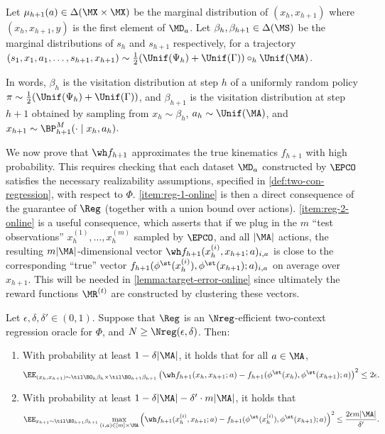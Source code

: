 \begin{definition}\label{def:marginals}
Let $\mu_{h+1}(a) \in \Delta(\MX\times\MX)$ be the marginal distribution of $(x_h,x_{h+1})$ where $(x_h,x_{h+1},y)$ is the first element of $\MD_a$. Let $\beta_h,\beta_{h+1} \in \Delta(\MS)$ be the marginal distributions of $s_h$ and $s_{h+1}$ respectively, for a trajectory $(s_1,x_1,a_1,\dots,s_{h+1},x_{h+1}) \sim \frac{1}{2}(\Unif(\Psi_h)+\Unif(\Gamma))\circ_h\Unif(\MA)$.
\end{definition}

In words, $\beta_h$ is the visitation distribution at step $h$ of a uniformly random policy $\pi \sim \frac{1}{2}(\Unif(\Psi_h)+\Unif(\Gamma))$, and $\beta_{h+1}$ is the visitation distribution at step $h+1$ obtained by sampling from $x_h \sim \beta_h$, $a_h \sim \Unif(\MA)$, and $x_{h+1} \sim \BP^M_{h+1}(\cdot\mid{}x_h,a_h)$.

We now prove that $\wh f_{h+1}$ approximates the true kinematics $f_{h+1}$ with high probability. This requires checking that each dataset $\MD_a$ constructed by $\EPCO$ satisfies the necessary realizability assumptions, specified in \cref{def:two-con-regression}, with respect to $\Phi$. \cref{item:reg-1-online} is then a direct consequence of the guarantee of $\Reg$ (together with a union bound over actions). \cref{item:reg-2-online} is a useful consequence, which asserts that if we plug in the $m$ ``test observations'' $x_h^{(1)},\dots,x_h^{(m)}$ sampled by $\EPCO$, and all $|\MA|$ actions, the resulting $m|\MA|$-dimensional vector $\wh f_{h+1}(x_h^{(i)},x_{h+1};a)_{i,a}$ is close to the corresponding ``true'' vector $f_{h+1}(\phi^\st(x_h^{(i)}),\phi^\st(x_{h+1});a)_{i,a}$ on average over $x_{h+1}$. This will be needed in \cref{lemma:target-error-online} since ultimately the reward functions $\MR^{(t)}$ are constructed by clustering these vectors.

\begin{lemma}\label{lemma:regression-bound-online}
Let $\epsilon,\delta,\delta' \in (0,1)$. Suppose that $\Reg$ is an $\Nreg$-efficient two-context regression oracle for $\Phi$, and $N \geq \Nreg(\epsilon,\delta)$. Then:
\begin{enumerate}
\item \label{item:reg-1-online} With probability at least $1-\delta|\MA|$, it holds that for all $a \in \MA$,
\[\EE_{(x_h,x_{h+1}) \sim \til\BO_h\beta_h \times \til\BO_{h+1}\beta_{h+1}}\left(\wh f_{h+1}(x_h,x_{h+1};a) - f_{h+1}(\phi^\st(x_h),\phi^\st(x_{h+1});a)\right)^2 \leq 2\epsilon.\]
\item \label{item:reg-2-online} With probability at least $1-\delta|\MA|-\delta'\cdot m|\MA|$, it holds that
\[\EE_{x_{h+1}\sim\til\BO_{h+1}\beta_{h+1}} \max_{(i,a)\in [m]\times\MA} \left(\wh f_{h+1}(x_h^{(i)},x_{h+1};a) - f_{h+1}(\phi^\st(x_h^{(i)}),\phi^\st(x_{h+1});a)\right)^2 \leq \frac{2\epsilon m|\MA|}{\delta'}.\]
\end{enumerate}
\end{lemma}


